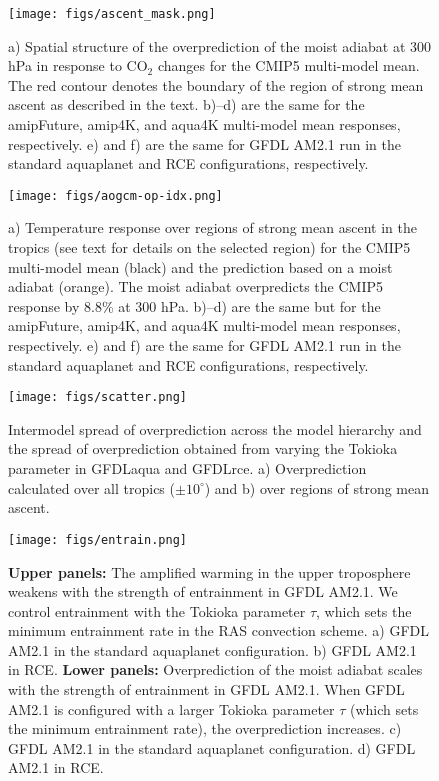 \documentclass{ametsocV5}
\begin{document}
\begin{figure}
\centering
\texttt{[image: figs/ascent\_mask.png]}
\caption{a) Spatial structure of the overprediction of the moist adiabat at 300 hPa in response to CO$_2$ changes for the CMIP5 multi-model mean. The red contour denotes the boundary of the region of strong mean ascent as described in the text. b)--d) are the same for the amipFuture, amip4K, and aqua4K multi-model mean responses, respectively. e) and f) are the same for GFDL AM2.1 run in the standard aquaplanet and RCE configurations, respectively.}
\label{fig:ascent_mask}
\end{figure}

\begin{figure}
\centering
\texttt{[image: figs/aogcm-op-idx.png]}
\caption{a) Temperature response over regions of strong mean ascent in the tropics (see text for details on the selected region) for the CMIP5 multi-model mean (black) and the prediction based on a moist adiabat (orange). The moist adiabat overpredicts the CMIP5 response by 8.8\% at 300 hPa. b)--d) are the same but for the amipFuture, amip4K, and aqua4K multi-model mean responses, respectively. e) and f) are the same for GFDL AM2.1 run in the standard aquaplanet and RCE configurations, respectively.}
\label{fig:aogcm-op-idx}
\end{figure}

\begin{figure}
\centering
\texttt{[image: figs/scatter.png]}
\caption{Intermodel spread of overprediction across the model hierarchy and the spread of overprediction obtained from varying the Tokioka parameter in GFDLaqua and GFDLrce. a) Overprediction calculated over all tropics ($\pm10^\circ$) and b) over regions of strong mean ascent.}
\label{fig:scatter}
\end{figure}

\begin{figure}
\centering
\texttt{[image: figs/entrain.png]}
\caption{\textbf{Upper panels:} The amplified warming in the upper troposphere weakens with the strength of entrainment in GFDL AM2.1. We control entrainment with the Tokioka parameter $\tau$, which sets the minimum entrainment rate in the RAS convection scheme. a) GFDL AM2.1 in the standard aquaplanet configuration. b) GFDL AM2.1 in RCE. \textbf{Lower panels:} Overprediction of the moist adiabat scales with the strength of entrainment in GFDL AM2.1. When GFDL AM2.1 is configured with a larger Tokioka parameter $\tau$ (which sets the minimum entrainment rate), the overprediction increases. c) GFDL AM2.1 in the standard aquaplanet configuration. d) GFDL AM2.1 in RCE.}
\label{fig:entrain}
\end{figure}
\end{document}
